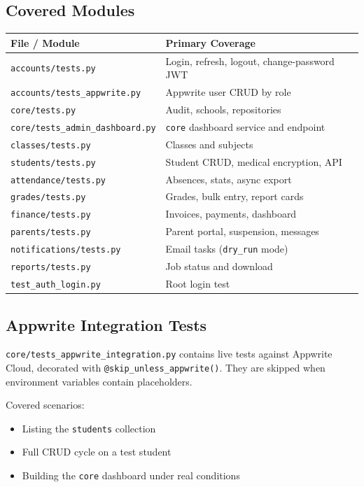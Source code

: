 \documentclass[11pt,a4paper]{article}
\begin{document}
\subsection{Covered Modules}

\begin{table}[h]
\centering
\begin{tabular}{lp{8cm}}
\toprule
\textbf{File / Module} & \textbf{Primary Coverage} \\
\midrule
\texttt{accounts/tests.py} & Login, refresh, logout, change-password JWT \\
\texttt{accounts/tests\_appwrite.py} & Appwrite user CRUD by role \\
\texttt{core/tests.py} & Audit, schools, repositories \\
\texttt{core/tests\_admin\_dashboard.py} & \texttt{core} dashboard service and endpoint \\
\texttt{classes/tests.py} & Classes and subjects \\
\texttt{students/tests.py} & Student CRUD, medical encryption, API \\
\texttt{attendance/tests.py} & Absences, stats, async export \\
\texttt{grades/tests.py} & Grades, bulk entry, report cards \\
\texttt{finance/tests.py} & Invoices, payments, dashboard \\
\texttt{parents/tests.py} & Parent portal, suspension, messages \\
\texttt{notifications/tests.py} & Email tasks (\texttt{dry\_run} mode) \\
\texttt{reports/tests.py} & Job status and download \\
\texttt{test\_auth\_login.py} & Root login test \\
\bottomrule
\end{tabular}
\end{table}

\subsection{Appwrite Integration Tests}

\texttt{core/tests\_appwrite\_integration.py} contains live tests against Appwrite Cloud, decorated with \texttt{@skip\_unless\_appwrite()}. They are skipped when environment variables contain placeholders.

Covered scenarios:
\begin{itemize}[noitemsep]
    \item Listing the \texttt{students} collection
    \item Full CRUD cycle on a test student
    \item Building the \texttt{core} dashboard under real conditions
\end{itemize}
\end{document}
